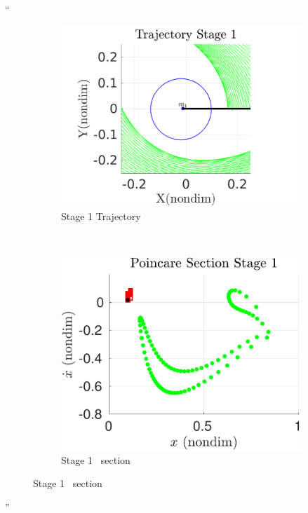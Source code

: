 \documentclass[11pt]{article}
\newenvironment{correction}{\begin{list}{}{\setlength{\leftmargin}{1cm}\setlength{\rightmargin}{1cm}}\vspace{\parsep}\item[]``}{''\end{list}}
\begin{document}
\begin{enumerate}
\begin{correction}
\begin{figure}[H]
    \centering
    \begin{subfigure}[htbp]{0.2\textwidth} 
        \includegraphics[width=\textwidth, keepaspectratio]{figures/geo_transfer/stage1_trajectory_zoom.pdf} 
        \caption{Stage 1 Trajectory} 
    \end{subfigure}~
    \begin{subfigure}[htbp]{0.2\textwidth} 
        \includegraphics[width=\textwidth, keepaspectratio]{figures/geo_transfer/stage1_poincare.pdf} 
        \caption{Stage 1 \Poincare~section } 
    \end{subfigure}



\end{figure}
\end{correction}
\end{enumerate}
\end{document}
